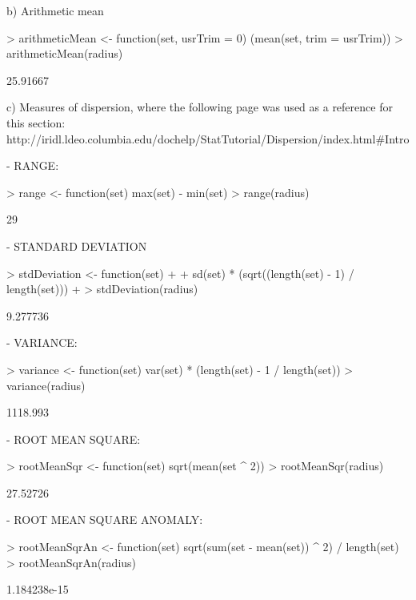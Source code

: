 \documentclass[a4paper]{article}
\begin{document}
		b) Arithmetic mean
\begin{Schunk}
\begin{Sinput}
> arithmeticMean <- function(set, usrTrim = 0) (mean(set, trim = usrTrim))
> arithmeticMean(radius)
\end{Sinput}
\begin{Soutput}
[1] 25.91667
\end{Soutput}
\end{Schunk}

		c) Measures of dispersion, where the following page was used as a reference for this section:
		http://iridl.ldeo.columbia.edu/dochelp/StatTutorial/Dispersion/index.html#Intro

			- RANGE:
\begin{Schunk}
\begin{Sinput}
> range <- function(set) {max(set) - min(set)}
> range(radius)
\end{Sinput}
\begin{Soutput}
[1] 29
\end{Soutput}
\end{Schunk}
			- STANDARD DEVIATION
\begin{Schunk}
\begin{Sinput}
> stdDeviation <- function(set) 
+ {
+    sd(set) * (sqrt((length(set) - 1) / length(set)))
+ }
> stdDeviation(radius)
\end{Sinput}
\begin{Soutput}
[1] 9.277736
\end{Soutput}
\end{Schunk}
			- VARIANCE:
\begin{Schunk}
\begin{Sinput}
> variance <- function(set) {var(set) * (length(set) - 1 / length(set))} 
> variance(radius)
\end{Sinput}
\begin{Soutput}
[1] 1118.993
\end{Soutput}
\end{Schunk}
			- ROOT MEAN SQUARE: 
\begin{Schunk}
\begin{Sinput}
> rootMeanSqr <- function(set) {sqrt(mean(set ^ 2))}
> rootMeanSqr(radius)
\end{Sinput}
\begin{Soutput}
[1] 27.52726
\end{Soutput}
\end{Schunk}
			- ROOT MEAN SQUARE ANOMALY:
\begin{Schunk}
\begin{Sinput}
> rootMeanSqrAn <- function(set) {sqrt(sum(set - mean(set)) ^ 2) / length(set)}
> rootMeanSqrAn(radius)
\end{Sinput}
\begin{Soutput}
[1] 1.184238e-15
\end{Soutput}
\end{Schunk}
\end{document}
